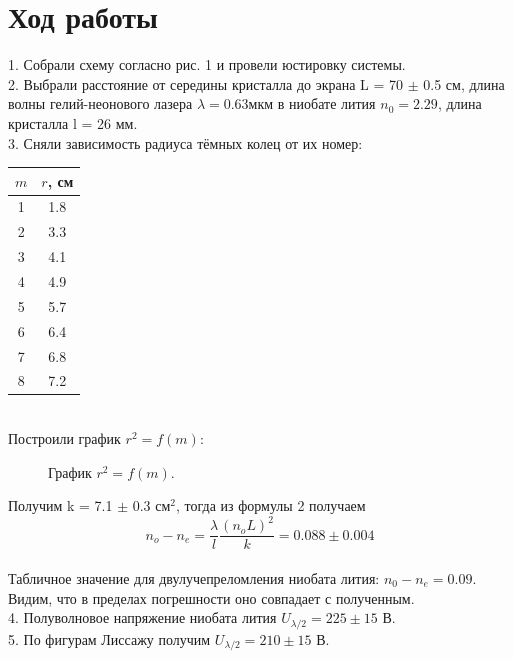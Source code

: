 \documentclass[a4paper,12pt]{article}
\begin{document}
\section{Ход работы}
1. Собрали схему согласно рис. 1 и провели юстировку системы.\\
2. Выбрали расстояние от середины кристалла до экрана L = 70 $\pm$ 0.5 см, длина волны гелий-неонового лазера $ \lambda = 0.63 мкм$ в ниобате лития $n_0 = 2.29$, длина кристалла l = 26 мм.  \\
3. Сняли зависимость радиуса тёмных колец от их номер: \\
\begin{table}[h]
\centering
\begin{tabular}{|c|c|}
\hline
$m$ & $r$, см  \\
\hline
1 & 1.8    \\
\hline
2 & 3.3    \\
\hline
3 & 4.1    \\
\hline
4 & 4.9    \\
\hline
5 & 5.7    \\
\hline
6 & 6.4    \\
\hline
7 & 6.8    \\
\hline
8 & 7.2    \\
\hline
\end{tabular}
\end{table}\\
Построили график $r^2 = f(m)$:
\begin{figure}[H]
 \caption{\centering График $r^2 = f(m)$.}
\end{figure}
Получим k = 7.1 $\pm$ 0.3 см$^2$, тогда из формулы 2 получаем\\
$$n_{o}-n_{e} = \dfrac{\lambda}{l} \dfrac{(n_oL)^2}{k} = 0.088 \pm 0.004$$ \\
Табличное значение для двулучепреломления ниобата лития: $n_0 - n_e = 0.09$. Видим, что в пределах погрешности оно совпадает с полученным.\\
4. Полуволновое напряжение ниобата лития  $U_{\lambda/2} = 225 \pm 15$ В.\\
5. По фигурам Лиссажу получим  $U_{\lambda/2} = 210 \pm 15$ В.\\
\end{document}
